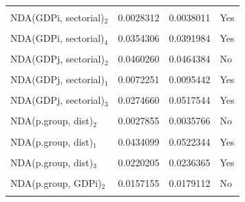 \documentclass[preprint, 3p,
authoryear]{elsarticle} %
\begin{document}
\begin{longtable}[t]{lrrl}
\cellcolor{gray!10}{NDA(GDPi, sectorial)$_1$} & \cellcolor{gray!10}{0.0045678} & \cellcolor{gray!10}{0.0055624} & \cellcolor{gray!10}{Yes}\\
NDA(GDPi, sectorial)$_2$ & 0.0028312 & 0.0038011 & Yes\\
\cellcolor{gray!10}{NDA(GDPi, sectorial)$_3$} & \cellcolor{gray!10}{0.0061049} & \cellcolor{gray!10}{0.0067377} & \cellcolor{gray!10}{Yes}\\
NDA(GDPi, sectorial)$_4$ & 0.0354306 & 0.0391984 & Yes\\
\cellcolor{gray!10}{NDA(GDPj, sectorial)$_1$} & \cellcolor{gray!10}{0.0070790} & \cellcolor{gray!10}{0.0094373} & \cellcolor{gray!10}{No}\\
NDA(GDPj, sectorial)$_2$ & 0.0460260 & 0.0464384 & No\\
\cellcolor{gray!10}{NDA(GDPj, sectorial)$_3$} & \cellcolor{gray!10}{0.0061488} & \cellcolor{gray!10}{0.0070157} & \cellcolor{gray!10}{No}\\
NDA(GDPj, sectorial)$_1$ & 0.0072251 & 0.0095442 & Yes\\
\cellcolor{gray!10}{NDA(GDPj, sectorial)$_2$} & \cellcolor{gray!10}{0.0348398} & \cellcolor{gray!10}{0.0353784} & \cellcolor{gray!10}{Yes}\\
NDA(GDPj, sectorial)$_3$ & 0.0274660 & 0.0517544 & Yes\\
\cellcolor{gray!10}{NDA(p.group, dist)$_1$} & \cellcolor{gray!10}{0.0065056} & \cellcolor{gray!10}{0.0082232} & \cellcolor{gray!10}{No}\\
NDA(p.group, dist)$_2$ & 0.0027855 & 0.0035766 & No\\
\cellcolor{gray!10}{NDA(p.group, dist)$_3$} & \cellcolor{gray!10}{0.0303914} & \cellcolor{gray!10}{0.0325690} & \cellcolor{gray!10}{No}\\
NDA(p.group, dist)$_1$ & 0.0434099 & 0.0522344 & Yes\\
\cellcolor{gray!10}{NDA(p.group, dist)$_2$} & \cellcolor{gray!10}{0.0089395} & \cellcolor{gray!10}{0.0114656} & \cellcolor{gray!10}{Yes}\\
NDA(p.group, dist)$_3$ & 0.0220205 & 0.0236365 & Yes\\
\cellcolor{gray!10}{NDA(p.group, GDPi)$_1$} & \cellcolor{gray!10}{0.0324417} & \cellcolor{gray!10}{0.0353575} & \cellcolor{gray!10}{No}\\
NDA(p.group, GDPi)$_2$ & 0.0157155 & 0.0179112 & No\\
\cellcolor{gray!10}{NDA(p.group, GDPi)$_3$} & \cellcolor{gray!10}{0.0555510} & \cellcolor{gray!10}{0.0691793} & \cellcolor{gray!10}{No}\\

\end{longtable}
\end{document}
